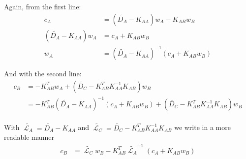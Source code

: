 \documentclass[]{article}
\DeclareMathOperator{\Lapl}{\mathcal{L}}
\begin{document}
Again, from the first line:
\begin{equation}
 \begin{split}
  c_A & = (\tilde{D_A} - K_{AA}) w_A - K_{AB} w_B \\
  (\tilde{D_A} - K_{AA}) w_A & = c_A + K_{AB} w_B \\
  w_A & = (\tilde{D_A} - K_{AA})^{-1} (c_A + K_{AB} w_B)
 \end{split}
\end{equation}

And with the second line:
\begin{equation}
 \begin{split}
  c_B & = -K_{AB}^T w_A + (\tilde{D_C} - K_{AB}^T K_{AA}^{-1} K_{AB}) w_B \\
      & = -K_{AB}^T (\tilde{D_A} - K_{AA})^{-1} (c_A + K_{AB} w_B) + (\tilde{D_C} - K_{AB}^T K_{AA}^{-1} K_{AB}) w_B \\
 \end{split}
\end{equation}

With \(\tilde{\Lapl_A} = \tilde{D_A} - K_{AA}\) and \(\tilde{\Lapl_C} = \tilde{D_C} - K_{AB}^T K_{AA}^{-1} K_{AB}\) we write in a more readable manner
\begin{equation}
 \begin{split}
  c_B & = \tilde{\Lapl_C} w_B - K_{AB}^T \tilde{\Lapl_A}^{-1} (c_A + K_{AB} w_B) \\
 \end{split}
\end{equation}

\clearpage
\printbibliography
\end{document}
